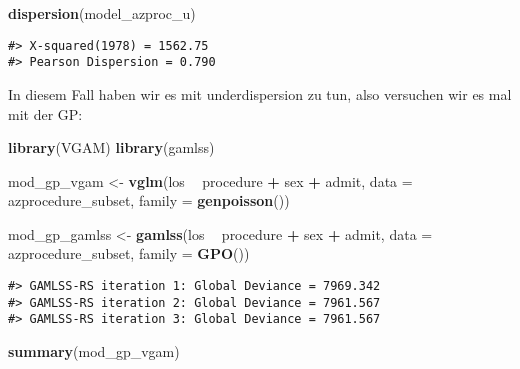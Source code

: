 \documentclass[ngerman,a4paper,]{scrartcl}
\newenvironment{Shaded}{\begin{snugshade}}{\end{snugshade}}
\newcommand{\DataTypeTok}[1]{\textcolor[rgb]{0.13,0.29,0.53}{#1}}
\newcommand{\KeywordTok}[1]{\textcolor[rgb]{0.13,0.29,0.53}{\textbf{#1}}}
\newcommand{\NormalTok}[1]{#1}
\newcommand{\OperatorTok}[1]{\textcolor[rgb]{0.81,0.36,0.00}{\textbf{#1}}}
\newcommand{\StringTok}[1]{\textcolor[rgb]{0.31,0.60,0.02}{#1}}
\theoremstyle{definition}
\theoremstyle{definition}
\theoremstyle{definition}
\theoremstyle{remark}
\begin{document}
\begin{Shaded}
\begin{Highlighting}[]
\KeywordTok{dispersion}\NormalTok{(model_azproc_u)}
\end{Highlighting}
\end{Shaded}

\begin{verbatim}
#> X-squared(1978) = 1562.75
#> Pearson Dispersion = 0.790
\end{verbatim}

In diesem Fall haben wir es mit underdispersion zu tun, also versuchen wir es mal mit der GP:

\begin{Shaded}
\begin{Highlighting}[]
\KeywordTok{library}\NormalTok{(VGAM)}
\KeywordTok{library}\NormalTok{(gamlss)}

\NormalTok{mod_gp_vgam <-}\StringTok{ }\KeywordTok{vglm}\NormalTok{(los }\OperatorTok{~}\StringTok{ }\NormalTok{procedure }\OperatorTok{+}\StringTok{ }\NormalTok{sex }\OperatorTok{+}\StringTok{ }\NormalTok{admit, }\DataTypeTok{data =}\NormalTok{ azprocedure_subset, }\DataTypeTok{family =} \KeywordTok{genpoisson}\NormalTok{())}

\NormalTok{mod_gp_gamlss <-}\StringTok{ }\KeywordTok{gamlss}\NormalTok{(los }\OperatorTok{~}\StringTok{ }\NormalTok{procedure }\OperatorTok{+}\StringTok{ }\NormalTok{sex }\OperatorTok{+}\StringTok{ }\NormalTok{admit, }\DataTypeTok{data =}\NormalTok{ azprocedure_subset, }\DataTypeTok{family =} \KeywordTok{GPO}\NormalTok{())}
\end{Highlighting}
\end{Shaded}

\begin{verbatim}
#> GAMLSS-RS iteration 1: Global Deviance = 7969.342 
#> GAMLSS-RS iteration 2: Global Deviance = 7961.567 
#> GAMLSS-RS iteration 3: Global Deviance = 7961.567
\end{verbatim}

\begin{Shaded}
\begin{Highlighting}[]
\KeywordTok{summary}\NormalTok{(mod_gp_vgam)}
\end{Highlighting}
\end{Shaded}
\end{document}
